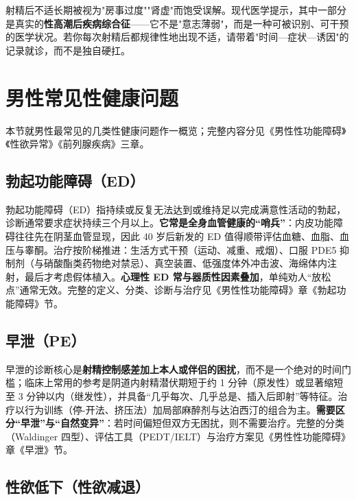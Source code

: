 \documentclass[12pt,a4paper,twoside]{ctexbook}
\begin{document}
\begin{tcolorbox}[colback=pink!5!white,colframe=red!50!black,title=贴心小叮咛]
射精后不适长期被视为"房事过度""肾虚"而饱受误解。现代医学提示，其中一部分是真实的\textbf{性高潮后疾病综合征}——它不是"意志薄弱"，而是一种可被识别、可干预的医学状况。若你每次射精后都规律性地出现不适，请带着"时间—症状—诱因"的记录就诊，而不是独自硬扛。
\end{tcolorbox}




\section{男性常见性健康问题}

本节就男性最常见的几类性健康问题作一概览；完整内容分见《男性性功能障碍》《性欲异常》《前列腺疾病》三章。

\subsection{勃起功能障碍（ED）}

勃起功能障碍（ED）指持续或反复无法达到或维持足以完成满意性活动的勃起，诊断通常要求症状持续三个月以上。\textbf{它常是全身血管健康的“哨兵”}：内皮功能障碍往往先在阴茎血管显现，因此 40 岁后新发的 ED 值得顺带评估血糖、血脂、血压与睾酮。治疗按阶梯推进：生活方式干预（运动、减重、戒烟）、口服 PDE5 抑制剂（与硝酸酯类药物绝对禁忌）、真空装置、低强度体外冲击波、海绵体内注射，最后才考虑假体植入。\textbf{心理性 ED 常与器质性因素叠加}，单纯劝人“放松点”通常无效。完整的定义、分类、诊断与治疗见《男性性功能障碍》章《勃起功能障碍》节。

\subsection{早泄（PE）}

早泄的诊断核心是\textbf{射精控制感差加上本人或伴侣的困扰}，而不是一个绝对的时间门槛；临床上常用的参考是阴道内射精潜伏期短于约 1 分钟（原发性）或显著缩短至 3 分钟以内（继发性），并具备“几乎每次、几乎总是、插入后即射”等特征。治疗以行为训练（停-开法、挤压法）加局部麻醉剂与达泊西汀的组合为主。\textbf{需要区分“早泄”与“自然变异”}：若时间偏短但双方无困扰，则不需要治疗。完整的分类（Waldinger 四型）、评估工具（PEDT/IELT）与治疗方案见《男性性功能障碍》章《早泄》节。

\subsection{性欲低下（性欲减退）}
\end{document}
